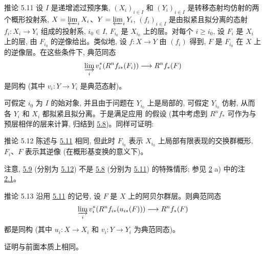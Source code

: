\begin{enonce*}{推论 5.11}
设 $I$ 是递增滤过预序集, $(X_i)_{i \in I}$ 和 $(Y_i)_{i \in I}$ 是转移态射均仿射的两个概形投射系, $X = \varprojlim_{i} X_i$、$Y = \varprojlim_{i} Y_i$, $(f_i)_{i \in I}$ 是由拟紧且拟分离的态射 $f_i : X_i \to Y_i$ 组成的投射系, $i_0 \in I$, $F_{i_0}$ 是 $X_{i_0}$ 上的层。对每个 $i \geq i_0$, 设 $F_i$ 是 $X_i$ 上的层\pageoriginale, 由 $F_{i_0}$ 的逆像给出。类似地, 设 $f : X \to Y$ 由 $(f_i)$ 得到, $F$ 是 $F_{i_0}$ 在 $X$ 上的逆像层。在这些条件下, 典范同态
$$
\varinjlim_{i} v^{\ast}_i (R^n f_{i\ast} (F_i)) \to R^n
f_{\ast} (F)
$$
是同构 (其中 $v_i : Y \to Y_i$ 是典范态射)。
\end{enonce*}

可假定 $i_0$ 为 $I$ 的始对象, 并且由于问题在 $Y_{i_0}$ 上是局部的, 可假定 $Y_{i_0}$ 仿射, 从而各 $Y_i$ 和 $X_i$ 都拟紧且拟分离。于是满足应用  的假设 (其中考虑到 $R^{n} f_{\ast}$ 可作为与预层相伴的层来计算, 归结到 \hyperref[VII.cor5.8]{5.8})。同样可证明:

\begin{enonce*}{推论 5.12}
陈述与 \hyperref[VII.cor5.11]{5.11} 相同, 但此时 $F_{i_0}$ 表示 $X_{i_0}$ 上局部有限表现的交换群概形, $F_i$、$F$ 表示其逆像 (在概形基变换的意义下)。
\end{enonce*}

注意, \hyperref[VII.cor5.9]{5.9} (分别为 \hyperref[VII.cor5.12]{5.12}) 不是 \hyperref[VII.cor5.8]{5.8} (分别为 \hyperref[VII.cor5.11]{5.11}) 的特殊情形; 参见 \hyperref[VII.sec2]{2} a) 中的注 \hyperref[VII.rem2.1]{2.1}。

\begin{enonce*}{推论 5.13}
沿用 \hyperref[VII.cor5.11]{5.11} 的记号, 设 $F$ 是 $X$ 上的阿贝尔群层。则典范同态
$$
\varinjlim_i v_i^{\ast} (R^n f_{i\ast} (u_{i\ast} (F))) \to
R^n f_{\ast} (F)
$$
都是同构 (其中 $u_i : X \to X_i$ 和 $v_i : Y \to Y_i$ 为典范同态)。
\end{enonce*}

证明与前面本质上相同。

